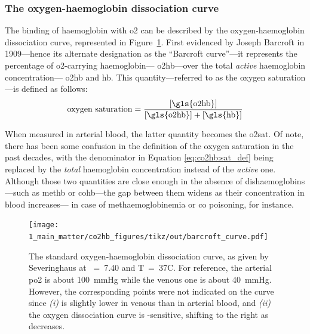 \subsubsection{The oxygen-haemoglobin dissociation curve}

The binding of haemoglobin with \gls{o2} can be described by the oxygen-haemoglobin dissociation curve, represented in Figure~\ref{fig:co2hb:barcroft_curve}. First evidenced by Joseph Barcroft in 1909\cite{barcroft1909}---hence its alternate designation as the \enquote{Barcroft curve}---it represents the percentage of \gls{o2}-carrying haemoglobin---\ie{} \gls{o2hb}---over the total \emph{active} haemoglobin concentration---\ie{} \gls{o2hb} and \gls{hb}. This quantity---referred to as the oxygen saturation---is defined as follows:
\begin{equation}\label{eq:co2hb:sat_def}
	\text{oxygen saturation} = \frac{[\text{\gls{o2hb}}]}{[\text{\gls{o2hb}}] + [\text{\gls{hb}}]}
\end{equation}

When measured in arterial blood, the latter quantity becomes the \gls{o2sat}. Of note, there has been some confusion in the definition of the oxygen saturation in the past decades, with the denominator in Equation \ref{eq:co2hb:sat_def} being replaced by the \emph{total} haemoglobin concentration instead of the \emph{active} one. Although those two quantities are close enough in the absence of dishaemoglobins---such as \gls{methb} or \gls{cohb}---the gap between them widens as their concentration in blood increases\cite{toffaletti2007}---\eg{} in case of methaemoglobinemia\cite{souza2008} or \gls{co} poisoning\cite{hampson2018}, for instance.

\begin{figure}
	\centering
	\texttt{[image: 1\_main\_matter/co2hb\_figures/tikz/out/barcroft\_curve.pdf]}
	\caption[The oxygen-haemoglobin dissociation curve.]{The standard oxygen-haemoglobin dissociation curve, as given by Severinghaus at \pH~=~7.40 and T~=~37{\degree}C\cite{severinghaus1966}. For reference, the arterial \gls{po2} is about 100~mmHg while the venous one is about 40~mmHg. However, the corresponding points were not indicated on the curve since \textit{(i)} \pH{} is slightly lower in venous than in arterial blood, and \textit{(ii)} the oxygen dissociation curve is \pH-sensitive, shifting to the right as \pH{} decreases\cite[Chap.~7]{levitzky2003pulmonary}.}
	\label{fig:co2hb:barcroft_curve}
\end{figure}

